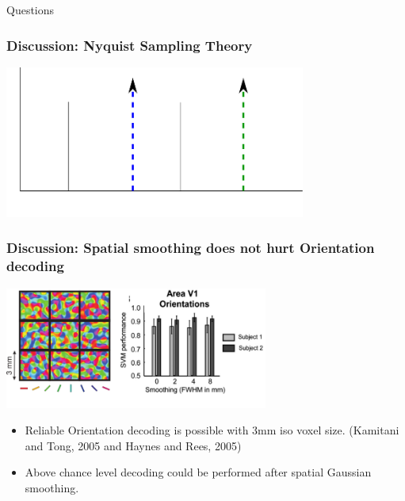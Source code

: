 \documentclass{beamer}
\begin{document}
  \begin{frame}
        \begin{center}
            Questions
        \end{center}
    \end{frame} 
    
  \begin{frame}
    \frametitle{Discussion: Nyquist Sampling Theory}
        \begin{center}
            \includegraphics[height=5cm]{../pictures/nyquist}
        \end{center}
    \end{frame}                        

  \begin{frame}
    \frametitle{Discussion: Spatial smoothing does not hurt Orientation decoding}
        \begin{center}
            \includegraphics[height=4cm]{../pictures/grid_3mm_op_de_beeck}
        \end{center}
        \begin{itemize}
            \item Reliable Orientation decoding is possible with 3mm iso voxel size. (Kamitani and Tong, 2005 and Haynes and Rees, 2005)
            \item Above chance level decoding could be performed after spatial Gaussian smoothing.
        \end{itemize}  
    \end{frame}
\end{document}
